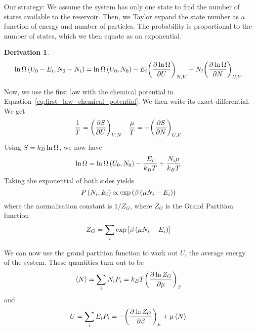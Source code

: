 \documentclass[12pt,chapterprefix=false,dvipsnames]{scrbook}
\theoremstyle{dotless}
\theoremstyle{definition}
\newtheorem{protoderivation}{Derivation}[section]
\newenvironment{derivation}
{\colorlet{shadecolor}{purple!15}\begin{shaded}\begin{protoderivation}}
			{\end{protoderivation}\end{shaded}}
\begin{document}
Our strategy: We assume the system has only one state to find
the number of states available to the reservoir. Then, we Taylor
expand the state number as a function of energy and number of
particles. The probability is proportional to the number of
states, which we then equate as an exponential.

\begin{derivation}
	\begin{equation}
		\naturallogarithm \Omega \left( U_0 - E_i, N_0 - N_i\right)
		=
		\naturallogarithm\Omega\left( U_0, N_0\right) - E_i
		{\left(\pdv{\naturallogarithm\Omega}{U}\right)}_{N,V} - N_i
		{\left(\pdv{\naturallogarithm\Omega}{N}\right)}_{U,V}
	\end{equation}

	Now, we use the first law with the chemical potential in
	Equation~\ref{eq:first_law_chemical_potential}. We then write its exact
	differential. We get
	\begin{equation}
		\frac{1}{T} = {\left(\pdv{S}{U}\right)}_{V,
		N}\hspace{1em} \frac{\mu}{T} =
		-{\left(\pdv{S}{N}\right)}_{U,V}
	\end{equation}
	Using $S = k_B \naturallogarithm\Omega$, we now have
	\begin{equation}
		\naturallogarithm\Omega =
		\naturallogarithm\Omega\left(U_0, N_0\right) -
		\frac{E_i}{k_B T} + \frac{N_i \mu}{k_B T}
	\end{equation}
	Taking the exponential of both sides yields
	\begin{equation}
		P\left(N_i, E_i\right) \propto \exponential\left( \beta
		\left(\mu N_i - E_i \right) \right)
	\end{equation}
	where the normalisation constant is $1/Z_G$,
	where $Z_G$ is the Grand Partition function
	\begin{equation}
		Z_G = \sum_i \exponential\left[ \beta \left( \mu N_i - E_i \right) \right]
	\end{equation}
\end{derivation}

We can now use the grand partition function to work out
$U$, the average energy of the system. These
quantities turn out to be
\begin{equation}
	\left< N \right>
	=
	\sum_i N_i P_i = k_B T {\left(\pdv{\naturallogarithm Z_G}{\mu}\right)}_{\beta}
\end{equation}
and
\begin{equation}
	U = \sum_i E_i P_i = - {\left(\pdv{\naturallogarithm Z_G}{\beta}\right)}_{\mu} + \mu
	\left<N\right>
\end{equation}
\end{document}
